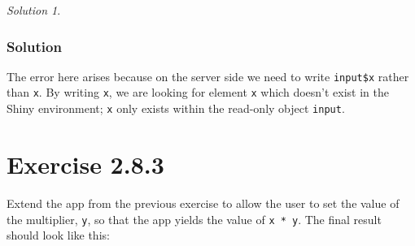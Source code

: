 \documentclass[
]{book}
\newenvironment{Shaded}{\begin{snugshade}}{\end{snugshade}}
\newcommand{\AttributeTok}[1]{\textcolor[rgb]{0.77,0.63,0.00}{#1}}
\newcommand{\ControlFlowTok}[1]{\textcolor[rgb]{0.13,0.29,0.53}{\textbf{#1}}}
\newcommand{\DecValTok}[1]{\textcolor[rgb]{0.00,0.00,0.81}{#1}}
\newcommand{\FunctionTok}[1]{\textcolor[rgb]{0.00,0.00,0.00}{#1}}
\newcommand{\NormalTok}[1]{#1}
\newcommand{\OtherTok}[1]{\textcolor[rgb]{0.56,0.35,0.01}{#1}}
\newcommand{\SpecialCharTok}[1]{\textcolor[rgb]{0.00,0.00,0.00}{#1}}
\newcommand{\StringTok}[1]{\textcolor[rgb]{0.31,0.60,0.02}{#1}}
\theoremstyle{definition}
\theoremstyle{definition}
\theoremstyle{definition}
\theoremstyle{definition}
\theoremstyle{remark}
\newtheorem*{solution}{Solution}
\begin{document}
\begin{solution}
\leavevmode

\hypertarget{solution-1}{%
\subsubsection*{Solution}\label{solution-1}}

The error here arises because on the server side we need to write \texttt{input\$x}
rather than \texttt{x}. By writing \texttt{x}, we are looking for element \texttt{x} which doesn't
exist in the Shiny environment; \texttt{x} only exists within the read-only object
\texttt{input}.

\begin{Shaded}
\end{Shaded}

\end{solution}

\hypertarget{exercise-2.8.3}{%
\section*{Exercise 2.8.3}\label{exercise-2.8.3}}

Extend the app from the previous exercise to allow the user to set the value of
the multiplier, \texttt{y}, so that the app yields the value of \texttt{x\ *\ y}. The final
result should look like this:
\end{document}

